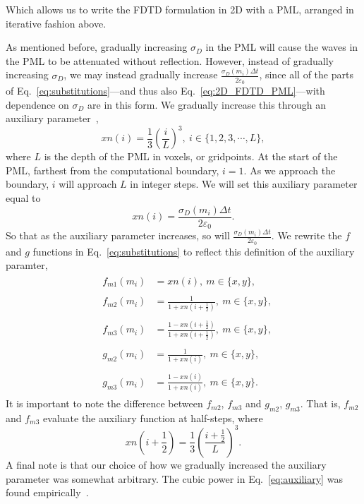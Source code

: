 \documentclass[12pt]{article}
\begin{document}
\begin{multicols}{2}
Which allows us to write the FDTD formulation in 2D with a PML, arranged in iterative fashion above.

As mentioned before, gradually increasing $\sigma_D$ in the PML will cause the waves in the PML to be attenuated without reflection. However, instead of gradually increasing $\sigma_D$, we may instead gradually increase $\frac{\sigma_D(m_i)\Delta t}{2\varepsilon_0}$, since all of the parts of Eq.~\ref{eq:substitutions}---and thus also Eq.~\ref{eq:2D_FDTD_PML}---with dependence on $\sigma_D$ are in this form. We gradually increase this through an auxiliary parameter~\cite{Sullivan00},
\begin{equation}
xn(i)=\frac{1}{3}\left(\frac{i}{L}\right)^3,~i\in\{1,2,3,\cdots,L\},
\end{equation}
where $L$ is the depth of the PML in voxels, or gridpoints. At the start of the PML, farthest from the computational boundary, $i=1$. As we approach the boundary, $i$ will approach $L$ in integer steps. We will set this auxiliary parameter equal to
\begin{equation}
\label{eq:auxiliary}
xn(i) = \frac{\sigma_D(m_i)\Delta t}{2\varepsilon_0}.
\end{equation}
So that as the auxiliary parameter increases, so will $\frac{\sigma_D(m_i)\Delta t}{2\varepsilon_0}$. We rewrite the $f$ and $g$ functions in Eq.~\ref{eq:substitutions} to reflect this definition of the auxiliary paramter,
\begin{subequations}
\begin{align}
&\begin{aligned}
f_{m1}(m_i) &= xn(i),~m\in\{x,y\},
\end{aligned}\\
&\begin{aligned}
f_{m2}(m_i) &= \frac{1}{1+xn\left(i+\frac{1}{2}\right)},~m\in\{x,y\},
\end{aligned}\\
&\begin{aligned}
f_{m3}(m_i) &= \frac{1-xn\left(i+\frac{1}{2}\right)}{1+xn\left(i+\frac{1}{2}\right)},~m\in\{x,y\},
\end{aligned}\\
&\begin{aligned}
g_{m2}(m_i) &= \frac{1}{1+xn\left(i\right)},~m\in\{x,y\},
\end{aligned}\\
&\begin{aligned}
g_{m3}(m_i) &= \frac{1-xn(i)}{1+xn(i)},~m\in\{x,y\}.
\end{aligned}
\end{align}
\end{subequations}
It is important to note the difference between $f_{m2}$, $f_{m3}$ and $g_{m2}$, $g_{m3}$. That is, $f_{m2}$ and $f_{m3}$ evaluate the auxiliary function at half-steps, where
\begin{equation}
xn(i+\frac{1}{2}) = \frac{1}{3}\left(\frac{i+\frac{1}{2}}{L}\right)^3.
\end{equation}
A final note is that our choice of how we gradually increased the auxiliary parameter was somewhat arbitrary. The cubic power in Eq.~\ref{eq:auxiliary} was found empirically~\cite{Sullivan00}.

\end{multicols}
\end{document}
